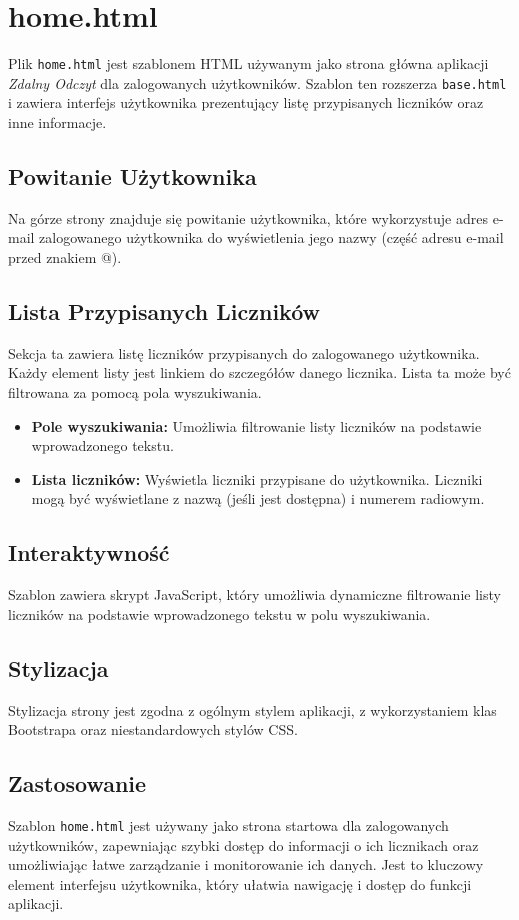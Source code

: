 \documentclass[12pt,a4paper]{report}
\begin{document}
\section{home.html}
\label{sec:home}
Plik \texttt{home.html} jest szablonem HTML używanym jako strona główna aplikacji \textit{Zdalny Odczyt} dla zalogowanych użytkowników. Szablon ten rozszerza \texttt{base.html} i zawiera interfejs użytkownika prezentujący listę przypisanych liczników oraz inne informacje.

\subsection{Powitanie Użytkownika}
Na górze strony znajduje się powitanie użytkownika, które wykorzystuje adres e-mail zalogowanego użytkownika do wyświetlenia jego nazwy (część adresu e-mail przed znakiem @).

\subsection{Lista Przypisanych Liczników}
Sekcja ta zawiera listę liczników przypisanych do zalogowanego użytkownika. Każdy element listy jest linkiem do szczegółów danego licznika. Lista ta może być filtrowana za pomocą pola wyszukiwania.

\begin{itemize}
\item \textbf{Pole wyszukiwania:} Umożliwia filtrowanie listy liczników na podstawie wprowadzonego tekstu.
\item \textbf{Lista liczników:} Wyświetla liczniki przypisane do użytkownika. Liczniki mogą być wyświetlane z nazwą (jeśli jest dostępna) i numerem radiowym.
\end{itemize}

\subsection{Interaktywność}
Szablon zawiera skrypt JavaScript, który umożliwia dynamiczne filtrowanie listy liczników na podstawie wprowadzonego tekstu w polu wyszukiwania.

\subsection{Stylizacja}
Stylizacja strony jest zgodna z ogólnym stylem aplikacji, z wykorzystaniem klas Bootstrapa oraz niestandardowych stylów CSS.

\subsection{Zastosowanie}
Szablon \texttt{home.html} jest używany jako strona startowa dla zalogowanych użytkowników, zapewniając szybki dostęp do informacji o ich licznikach oraz umożliwiając łatwe zarządzanie i monitorowanie ich danych. Jest to kluczowy element interfejsu użytkownika, który ułatwia nawigację i dostęp do funkcji aplikacji.
\end{document}
